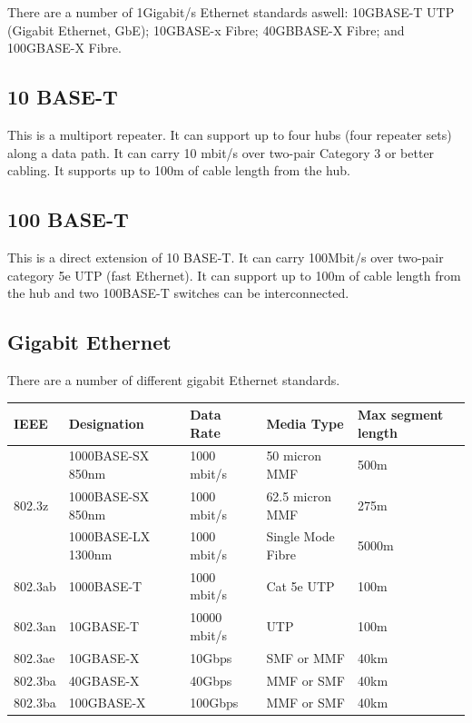 There are a number of 1Gigabit/s Ethernet standards aswell: 10GBASE-T UTP (Gigabit Ethernet, GbE); 10GBASE-x Fibre; 40GBBASE-X Fibre; and 100GBASE-X Fibre.

\subsection*{10 BASE-T}
This is a multiport repeater. It can support up to four hubs (four repeater sets) along a data path. It can carry 10 mbit/s over two-pair Category 3 or better cabling. It supports up to 100m of cable length from the hub.

\subsection*{100 BASE-T}
This is a direct extension of 10 BASE-T. It can carry 100Mbit/s over two-pair category 5e UTP (fast Ethernet). It can support up to 100m of cable length from the hub and two 100BASE-T switches can be interconnected.

\subsection*{Gigabit Ethernet}
There are a number of different gigabit Ethernet standards.
\begin{table}[H]
    \centering
    \begin{tabularx}{0.9\textwidth}{X|XXXX}
    \textbf{IEEE} & \textbf{Designation} & \textbf{Data Rate} & \textbf{Media Type} & \textbf{Max segment length} \\
    \hline
    \multirow{3}{*}{802.3z} & 1000BASE-SX 850nm & 1000 mbit/s & 50 micron MMF & 500m \\
     & 1000BASE-SX 850nm & 1000 mbit/s & 62.5 micron MMF & 275m \\
     & 1000BASE-LX 1300nm & 1000 mbit/s & Single Mode Fibre & 5000m \\
    802.3ab & 1000BASE-T & 1000 mbit/s & Cat 5e UTP & 100m \\
    802.3an & 10GBASE-T & 10000 mbit/s & UTP & 100m \\
    802.3ae & 10GBASE-X & 10Gbps & SMF or MMF & 40km \\
    802.3ba & 40GBASE-X & 40Gbps & MMF or SMF & 40km \\
    802.3ba & 100GBASE-X & 100Gbps & MMF or SMF & 40km\\
    \end{tabularx}
\end{table}
